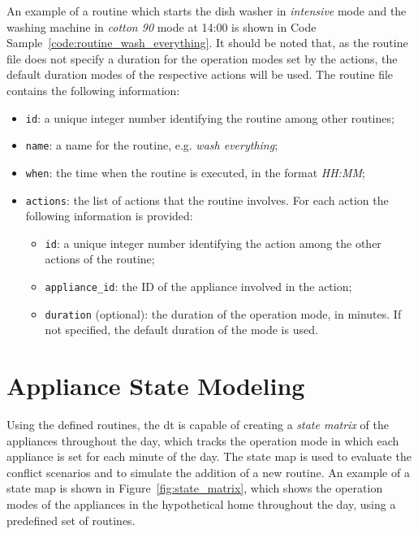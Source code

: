 An example of a routine which starts the dish washer in \textit{intensive} mode and the washing machine in \textit{cotton 90} mode at 14:00 is shown in Code Sample~\ref{code:routine_wash_everything}. It should be noted that, as the routine file does not specify a duration for the operation modes set by the actions, the default duration modes of the respective actions will be used. The routine file contains the following information:
\begin{itemize}
    \item \texttt{id}: a unique integer number identifying the routine among other routines;
    \item \texttt{name}: a name for the routine, e.g. \textit{wash everything};
    \item \texttt{when}: the time when the routine is executed, in the format \textit{HH:MM};
    \item \texttt{actions}: the list of actions that the routine involves. For each action the following information is provided:
          \begin{itemize}
              \item \texttt{id}: a unique integer number identifying the action among the other actions of the routine;
              \item \texttt{appliance\_id}: the ID of the appliance involved in the action;
              \item \texttt{duration} (optional): the duration of the operation mode, in minutes. If not specified, the default duration of the mode is used.
          \end{itemize}
\end{itemize}



\section{Appliance State Modeling}

Using the defined routines, the \acrshort{dt} is capable of creating a \textit{state matrix} of the appliances throughout the day, which tracks the operation mode in which each appliance is set for each minute of the day. The state map is used to evaluate the conflict scenarios and to simulate the addition of a new routine. An example of a state map is shown in Figure~\ref{fig:state_matrix}, which shows the operation modes of the appliances in the hypothetical home throughout the day, using a predefined set of routines.


